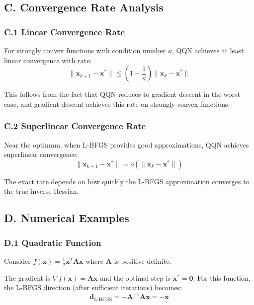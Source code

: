 \hypertarget{c.-convergence-rate-analysis}{%
\subsection{C. Convergence Rate Analysis}\label{c.-convergence-rate-analysis}}

\hypertarget{c.1-linear-convergence-rate}{%
\subsubsection{C.1 Linear Convergence Rate}\label{c.1-linear-convergence-rate}}

For strongly convex functions with condition number \(\kappa\), QQN achieves at least linear convergence with rate:
\[\|\mathbf{x}_{k+1} - \mathbf{x}^*\| \leq \left(1 - \frac{1}{\kappa}\right)\|\mathbf{x}_k - \mathbf{x}^*\|\]

This follows from the fact that QQN reduces to gradient descent in the worst case, and gradient descent achieves this rate on strongly convex functions.

\hypertarget{c.2-superlinear-convergence-rate}{%
\subsubsection{C.2 Superlinear Convergence Rate}\label{c.2-superlinear-convergence-rate}}

Near the optimum, when L-BFGS provides good approximations, QQN achieves superlinear convergence:
\[\|\mathbf{x}_{k+1} - \mathbf{x}^*\| = o(\|\mathbf{x}_k - \mathbf{x}^*\|)\]

The exact rate depends on how quickly the L-BFGS approximation converges to the true inverse Hessian.

\hypertarget{d.-numerical-examples}{%
\subsection{D. Numerical Examples}\label{d.-numerical-examples}}

\hypertarget{d.1-quadratic-function}{%
\subsubsection{D.1 Quadratic Function}\label{d.1-quadratic-function}}

Consider \(f(\mathbf{x}) = \frac{1}{2}\mathbf{x}^T \mathbf{A} \mathbf{x}\) where \(\mathbf{A}\) is positive definite.

The gradient is \(\nabla f(\mathbf{x}) = \mathbf{A}\mathbf{x}\) and the optimal step is \(\mathbf{x}^* = \mathbf{0}\).
For this function, the L-BFGS direction (after sufficient iterations) becomes:
\[\mathbf{d}_{\text{L-BFGS}} = -\mathbf{A}^{-1}\mathbf{A}\mathbf{x} = -\mathbf{x}\]

